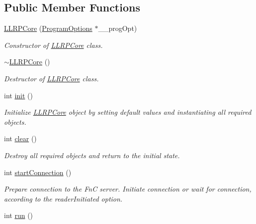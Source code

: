 \subsection*{Public Member Functions}
\begin{DoxyCompactItemize}
\item 
\hyperlink{class_e_l_f_i_n_1_1_l_l_r_p_core_ac9ab3ee0620427813694e1c9b0ad1f80}{L\-L\-R\-P\-Core} (\hyperlink{class_e_l_f_i_n_1_1_program_options}{Program\-Options} $\ast$\-\_\-\-\_\-prog\-Opt)
\begin{DoxyCompactList}\small\item\em Constructor of \hyperlink{class_e_l_f_i_n_1_1_l_l_r_p_core}{L\-L\-R\-P\-Core} class. \end{DoxyCompactList}\item 
\hyperlink{class_e_l_f_i_n_1_1_l_l_r_p_core_ac6a776c45e59d366b39714f4d313cf30}{$\sim$\-L\-L\-R\-P\-Core} ()
\begin{DoxyCompactList}\small\item\em Destructor of \hyperlink{class_e_l_f_i_n_1_1_l_l_r_p_core}{L\-L\-R\-P\-Core} class. \end{DoxyCompactList}\item 
int \hyperlink{class_e_l_f_i_n_1_1_l_l_r_p_core_a70f26fde25b719082c2738e816e25438}{init} ()
\begin{DoxyCompactList}\small\item\em Initialize \hyperlink{class_e_l_f_i_n_1_1_l_l_r_p_core}{L\-L\-R\-P\-Core} object by setting default values and instantiating all required objects. \end{DoxyCompactList}\item 
int \hyperlink{class_e_l_f_i_n_1_1_l_l_r_p_core_aa0a970f6209038d2e89a2957c89c4570}{clear} ()
\begin{DoxyCompactList}\small\item\em Destroy all required objects and return to the initial state. \end{DoxyCompactList}\item 
int \hyperlink{class_e_l_f_i_n_1_1_l_l_r_p_core_a96cf0d4f95c33a628b4c7ea358a9c19a}{start\-Connection} ()
\begin{DoxyCompactList}\small\item\em Prepare connection to the Fn\-C server. Initiate connection or wait for connection, according to the {\itshape reader\-Initiated} option. \end{DoxyCompactList}\item 
int \hyperlink{class_e_l_f_i_n_1_1_l_l_r_p_core_a7fb97667d470bfddac25da751cf8480e}{run} ()

\end{DoxyCompactItemize}
